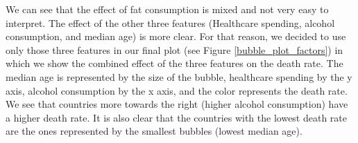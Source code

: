 We can see that the effect of fat consumption is mixed and not very easy to interpret. The effect of the other three features 
(Healthcare spending, alcohol consumption, and median age) is more clear. For that reason, we decided to use only those three features in our final plot 
(see Figure \ref{bubble_plot_factors}) in which we show the combined effect of the three features on the death rate. The median age 
is represented by the size of the bubble, healthcare spending by the y axis, alcohol consumption by the x axis, and the color represents the death rate.
We see that countries more towards the right (higher alcohol consumption) have a higher death rate. It is also clear that the countries with 
the lowest death rate are the ones represented by the smallest bubbles (lowest median age).